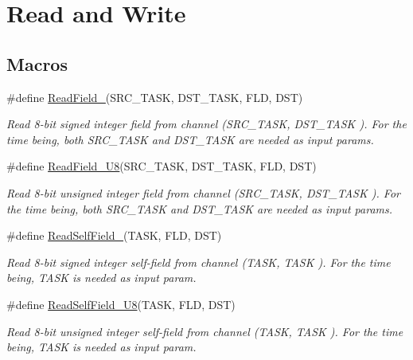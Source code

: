 \hypertarget{group__interpow__read__write}{}\section{Read and Write}
\label{group__interpow__read__write}
\subsection*{Macros}
\begin{DoxyCompactItemize}
\item 
\#define \hyperlink{group__interpow__read__write_ga6fd2426c3c4616b2bb53b91bad65185a}{Read\+Field\+\_}(S\+R\+C\+\_\+\+T\+A\+SK,  D\+S\+T\+\_\+\+T\+A\+SK,  F\+LD,  D\+ST)
\begin{DoxyCompactList}\small\item\em Read 8-\/bit signed integer field from channel ({\itshape S\+R\+C\+\_\+\+T\+A\+SK}, {\itshape D\+S\+T\+\_\+\+T\+A\+SK} ). For the time being, both S\+R\+C\+\_\+\+T\+A\+SK and D\+S\+T\+\_\+\+T\+A\+SK are needed as input params. \end{DoxyCompactList}\item 
\#define \hyperlink{group__interpow__read__write_ga5eec83d25a522d70d194715cc7ff038e}{Read\+Field\+\_\+\+U8}(S\+R\+C\+\_\+\+T\+A\+SK,  D\+S\+T\+\_\+\+T\+A\+SK,  F\+LD,  D\+ST)
\begin{DoxyCompactList}\small\item\em Read 8-\/bit unsigned integer field from channel ({\itshape S\+R\+C\+\_\+\+T\+A\+SK}, {\itshape D\+S\+T\+\_\+\+T\+A\+SK} ). For the time being, both S\+R\+C\+\_\+\+T\+A\+SK and D\+S\+T\+\_\+\+T\+A\+SK are needed as input params. \end{DoxyCompactList}\item 
\#define \hyperlink{group__interpow__read__write_ga184cbe0d981e72e70afc728331574aba}{Read\+Self\+Field\+\_}(T\+A\+SK,  F\+LD,  D\+ST)
\begin{DoxyCompactList}\small\item\em Read 8-\/bit signed integer self-\/field from channel ({\itshape T\+A\+SK}, {\itshape T\+A\+SK} ). For the time being, T\+A\+SK is needed as input param. \end{DoxyCompactList}\item 
\#define \hyperlink{group__interpow__read__write_ga863ffeec91ffffab0966a26c91785e27}{Read\+Self\+Field\+\_\+\+U8}(T\+A\+SK,  F\+LD,  D\+ST)
\begin{DoxyCompactList}\small\item\em Read 8-\/bit unsigned integer self-\/field from channel ({\itshape T\+A\+SK}, {\itshape T\+A\+SK} ). For the time being, T\+A\+SK is needed as input param. \end{DoxyCompactList}\item 

\end{DoxyCompactItemize}
